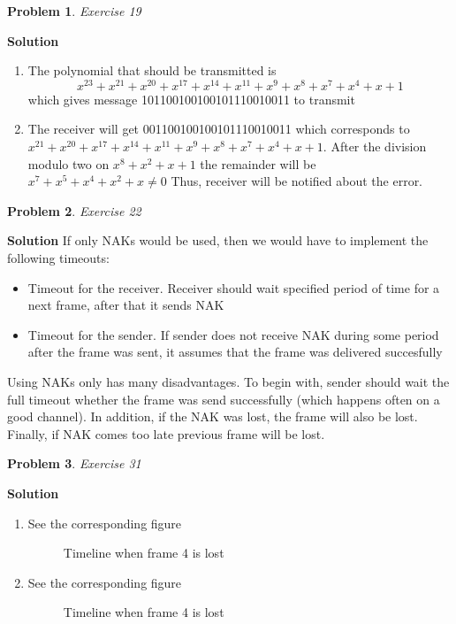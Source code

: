 \documentclass[11pt]{article} %
\newtheorem{prob}{Problem}
\newenvironment{solution}%
{\par\textbf{Solution}\space }%
{\par}
\begin{document}
\begin{prob}
	Exercise 19
\end{prob}
\begin{solution}
	\begin{enumerate}[label=(\alph*)]
		\item{The polynomial that should be transmitted is
			\[x^{23}+x^{21}+x^{20}+x^{17}+x^{14}+x^{11}+x^9+x^8+x^7+x^4+x+1\]
			which gives message 101100100100101110010011 to transmit
			}
		\item{The receiver will get 001100100100101110010011 which corresponds to 
			$x^{21}+x^{20}+x^{17}+x^{14}+x^{11}+x^9+x^8+x^7+x^4+x+1$. After the division modulo two
			on $x^8+x^2+x+1$ the remainder will be $x^7+x^5+x^4+x^2+x\neq 0$} Thus, receiver will be notified about the error.
	\end{enumerate}
\end{solution}
\begin{prob}
	Exercise 22
\end{prob}
\begin{solution}
	If only NAKs would be used, then we would have to implement the following timeouts:
	\begin{itemize}
		\item{Timeout for the receiver. Receiver should wait specified period of time for a next frame, after that it sends
			NAK}
		\item{Timeout for the sender. If sender does not receive NAK during some period after the frame was sent, it assumes that the 
			frame was delivered succesfully}
	\end{itemize}
	Using NAKs only has many disadvantages. To begin with, sender should wait the full timeout whether the frame was send successfully (which
	happens often on a good channel). In addition, if the NAK was lost, the frame will also be lost. Finally, if NAK comes too late previous
	frame will be lost.
\end{solution}
\begin{prob}
	Exercise 31
\end{prob}
\begin{solution}
	\begin{enumerate}[label=(\alph*)]
		\item{See the corresponding figure
\begin{figure}[H]
\centering
{}
\caption{Timeline when frame 4 is lost}
\end{figure}
			}
		\item{See the corresponding figure
\begin{figure}[H]
\centering
{}
\caption{Timeline when frame 4 is lost}
\end{figure}
			}
	\end{enumerate}
\end{solution}
\end{document}
